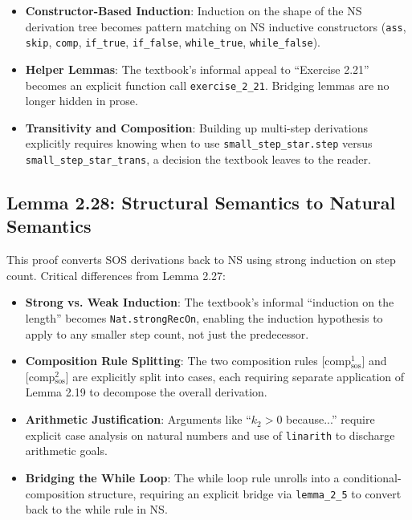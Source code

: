 \begin{itemize}
    \item \textbf{Constructor-Based Induction}:
    Induction on the shape of the NS derivation tree becomes pattern matching
    on NS inductive constructors (\texttt{ass}, \texttt{skip}, \texttt{comp},
    \texttt{if\_true}, \texttt{if\_false}, \texttt{while\_true},
    \texttt{while\_false}).
    
    \item \textbf{Helper Lemmas}:
    The textbook's informal appeal to ``Exercise 2.21'' becomes an explicit
    function call \texttt{exercise\_2\_21}. Bridging lemmas are no longer
    hidden in prose.
    
    \item \textbf{Transitivity and Composition}:
    Building up multi-step derivations explicitly requires knowing when to
    use \texttt{small\_step\_star.step} versus \texttt{small\_step\_star\_trans},
    a decision the textbook leaves to the reader.
\end{itemize}

\subsection*{Lemma 2.28: Structural Semantics to Natural Semantics}

This proof converts SOS derivations back to NS using strong induction on
step count. Critical differences from Lemma 2.27:

\begin{itemize}
    \item \textbf{Strong vs. Weak Induction}:
    The textbook's informal ``induction on the length'' becomes
    \texttt{Nat.strongRecOn}, enabling the induction hypothesis to apply to
    any smaller step count, not just the predecessor.
    
    \item \textbf{Composition Rule Splitting}:
    The two composition rules [comp$_{\text{sos}}^1$] and
    [comp$_{\text{sos}}^2$] are explicitly split into cases,
    each requiring separate application of Lemma 2.19 to decompose the
    overall derivation.
    
    \item \textbf{Arithmetic Justification}:
    Arguments like ``$k_2 > 0$ because...'' require explicit case analysis
    on natural numbers and use of \texttt{linarith} to discharge arithmetic goals.
    
    \item \textbf{Bridging the While Loop}:
    The while loop rule unrolls into a conditional-composition structure,
    requiring an explicit bridge via \texttt{lemma\_2\_5} to convert back
    to the while rule in NS.
\end{itemize}

